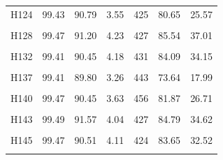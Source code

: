 \documentclass[
  a4paper,
  titlepage]{article}
\begin{document}
\begin{longtable}[t]{lllllll}
H124 & 99.43 & 90.79 & 3.55 & 425 & 80.65 & 25.57\\
 
\cellcolor{gray!6}{H127} & \cellcolor{gray!6}{99.45} & \cellcolor{gray!6}{92.27} & \cellcolor{gray!6}{3.67} & \cellcolor{gray!6}{327} & \cellcolor{gray!6}{82.04} & \cellcolor{gray!6}{29.39}\\
 
H128 & 99.47 & 91.20 & 4.23 & 427 & 85.54 & 37.01\\
 
\cellcolor{gray!6}{H129} & \cellcolor{gray!6}{99.42} & \cellcolor{gray!6}{90.47} & \cellcolor{gray!6}{3.29} & \cellcolor{gray!6}{432} & \cellcolor{gray!6}{77.33} & \cellcolor{gray!6}{20.22}\\
 
H132 & 99.41 & 90.45 & 4.18 & 431 & 84.09 & 34.15\\
 
\cellcolor{gray!6}{H135} & \cellcolor{gray!6}{99.36} & \cellcolor{gray!6}{91.57} & \cellcolor{gray!6}{3.63} & \cellcolor{gray!6}{427} & \cellcolor{gray!6}{82.22} & \cellcolor{gray!6}{28.53}\\
 
H137 & 99.41 & 89.80 & 3.26 & 443 & 73.64 & 17.99\\
 
\cellcolor{gray!6}{H138} & \cellcolor{gray!6}{99.41} & \cellcolor{gray!6}{90.88} & \cellcolor{gray!6}{4.06} & \cellcolor{gray!6}{424} & \cellcolor{gray!6}{84.20} & \cellcolor{gray!6}{33.28}\\
 
H140 & 99.47 & 90.45 & 3.63 & 456 & 81.87 & 26.71\\
 
\cellcolor{gray!6}{H142} & \cellcolor{gray!6}{99.42} & \cellcolor{gray!6}{90.40} & \cellcolor{gray!6}{3.06} & \cellcolor{gray!6}{446} & \cellcolor{gray!6}{75.50} & \cellcolor{gray!6}{17.51}\\
 
H143 & 99.49 & 91.57 & 4.04 & 427 & 84.79 & 34.62\\
 
\cellcolor{gray!6}{H144} & \cellcolor{gray!6}{99.41} & \cellcolor{gray!6}{91.64} & \cellcolor{gray!6}{3.55} & \cellcolor{gray!6}{419} & \cellcolor{gray!6}{81.41} & \cellcolor{gray!6}{27.28}\\
 
H145 & 99.47 & 90.51 & 4.11 & 424 & 83.65 & 32.52\\
 
\cellcolor{gray!6}{H146} & \cellcolor{gray!6}{99.44} & \cellcolor{gray!6}{90.89} & \cellcolor{gray!6}{3.44} & \cellcolor{gray!6}{414} & \cellcolor{gray!6}{78.28} & \cellcolor{gray!6}{22.74}\\
 

\end{longtable}
\end{document}
